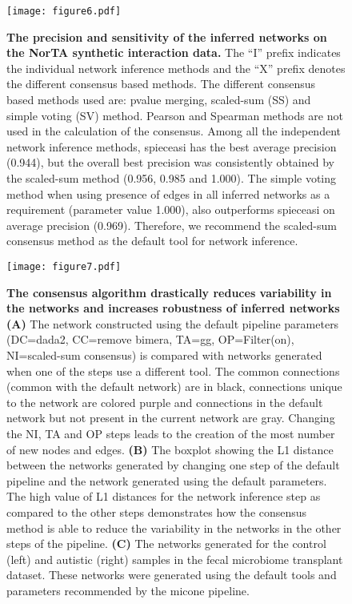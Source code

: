   \begin{figure}[h]
    \centering
    \texttt{[image: figure6.pdf]}
    \caption{
      \textbf{The precision and sensitivity of the inferred networks on the NorTA synthetic interaction data.}
      The ``I'' prefix indicates the individual network inference methods and the ``X'' prefix denotes the different consensus based methods.
      The different consensus based methods used are: pvalue merging, scaled-sum (SS) and simple voting (SV) method.
      Pearson and Spearman methods are not used in the calculation of the consensus.
      Among all the independent network inference methods, \ac{spieceasi} has the best average precision (0.944), but the overall best precision was consistently obtained by the scaled-sum method (0.956, 0.985 and 1.000).
      The simple voting method when using presence of edges in all inferred networks as a requirement (parameter value 1.000), also outperforms \ac{spieceasi} on average precision (0.969).
      Therefore, we recommend the scaled-sum consensus method as the default tool for network inference.
    }
    \label{fig:figure6}
  \end{figure}
  \FloatBarrier
  \newpage

  \begin{figure}[h]
    \centering
    \texttt{[image: figure7.pdf]}
    \caption{
      \textbf{The consensus algorithm drastically reduces variability in the networks and increases robustness of inferred networks}
      \textbf{(A)} The network constructed using the default pipeline parameters (DC=\ac{dada2}, CC=remove bimera, TA=\ac{gg}, OP=Filter(on), NI=scaled-sum consensus) is compared with networks generated when one of the steps use a different tool.
      The common connections (common with the default network) are in black, connections unique to the network are colored purple and connections in the default network but not present in the current network are gray.
      Changing the NI, TA and OP steps leads to the creation of the most number of new nodes and edges.
      \textbf{(B)} The boxplot showing the L1 distance between the networks generated by changing one step of the default pipeline and the network generated using the default parameters.
      The high value of L1 distances for the network inference step as compared to the other steps demonstrates how the consensus method is able to reduce the variability in the networks in the other steps of the pipeline.
      \textbf{(C)} The networks generated for the control (left) and autistic (right) samples in the fecal microbiome transplant dataset.
      These networks were generated using the default tools and parameters recommended by the \ac{micone} pipeline.
    }
    \label{fig:figure7}
  \end{figure}
